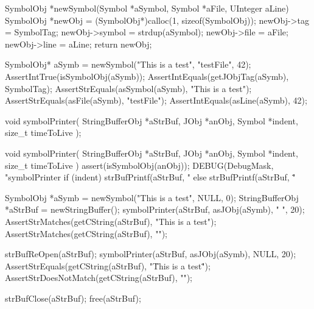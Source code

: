 \startCCode
SymbolObj *newSymbol(Symbol *aSymbol, Symbol *aFile, UInteger aLine) {
  SymbolObj *newObj =
    (SymbolObj*)calloc(1, sizeof(SymbolObj));
  newObj->tag    = SymbolTag;
  newObj->symbol = strdup(aSymbol);
  newObj->file   = aFile;
  newObj->line   = aLine;
  return newObj;
}
\stopCCode


\startCTest
  SymbolObj* aSymb = newSymbol("This is a test", "testFile", 42);
  AssertIntTrue(isSymbolObj(aSymb));
  AssertIntEquals(getJObjTag(aSymb), SymbolTag);
  AssertStrEquals(asSymbol(aSymb), "This is a test");
  AssertStrEquals(asFile(aSymb), "testFile");
  AssertIntEquals(asLine(aSymb), 42);
\stopCTest
\stopTestCase
\stopTestSuite

\startTestSuite[symbolPrinter]

\startCHeader
void symbolPrinter(
  StringBufferObj *aStrBuf,
  JObj            *anObj,
  Symbol          *indent,
  size_t           timeToLive
);
\stopCHeader

\startCCode
void symbolPrinter(
  StringBufferObj *aStrBuf,
  JObj            *anObj,
  Symbol          *indent,
  size_t           timeToLive
) {
  assert(isSymbolObj(anObj));
  DEBUG(DebugMask, "symbolPrinter %
  if (indent) {
    strBufPrintf(aStrBuf, "%
  } else {
    strBufPrintf(aStrBuf, "\"%
  }
}
\stopCCode


\startCTest
  SymbolObj *aSymb = newSymbol("This is a test", NULL, 0);
  StringBufferObj *aStrBuf = newStringBuffer();
  symbolPrinter(aStrBuf, asJObj(aSymb), "  ", 20);
  AssertStrMatches(getCString(aStrBuf), "This is a test");
  AssertStrMatches(getCString(aStrBuf), "\n");
  
  strBufReOpen(aStrBuf);
  symbolPrinter(aStrBuf, asJObj(aSymb), NULL, 20);
  AssertStrEquals(getCString(aStrBuf), "\"This is a test\" ");
  AssertStrDoesNotMatch(getCString(aStrBuf), "\n");
  
  strBufClose(aStrBuf);
  free(aStrBuf);
\stopCTest

\stopTestCase
\stopTestSuite